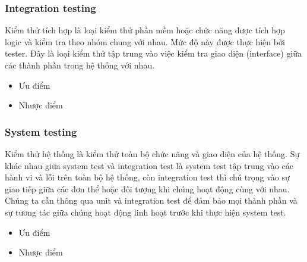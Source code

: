 \subsubsection{Integration testing}
Kiểm thử tích hợp là loại kiểm thử phần mềm hoặc chức năng được tích hợp logic và kiểm tra theo nhóm chung với nhau. Mức độ này được thực hiện bởi tester. Đây là loại kiểm thử tập trung vào việc kiểm tra giao diện (interface) giữa các thành phần trong hệ thống với nhau.

\begin{itemize}
    \item Ưu điểm
    \item Nhược điểm
\end{itemize}

\subsubsection{System testing}
Kiểm thử hệ thống là kiểm thử toàn bộ chức năng và giao diện của hệ thống. Sự khác nhau giữa system test và integration test là system test tập trung vào các hành vi và lỗi trên toàn bộ hệ thống, còn integration test thì chú trọng vào sự giao tiếp giữa các đơn thể hoặc đối tượng khi chúng hoạt động cùng với nhau. Chúng ta cần thông qua unit và integration test để đảm bảo mọi thành phần và sự tương tác giữa chúng hoạt động linh hoạt trước khi thực hiện system test.

\begin{itemize}
    \item Ưu điểm
    \item Nhược điểm
\end{itemize}

